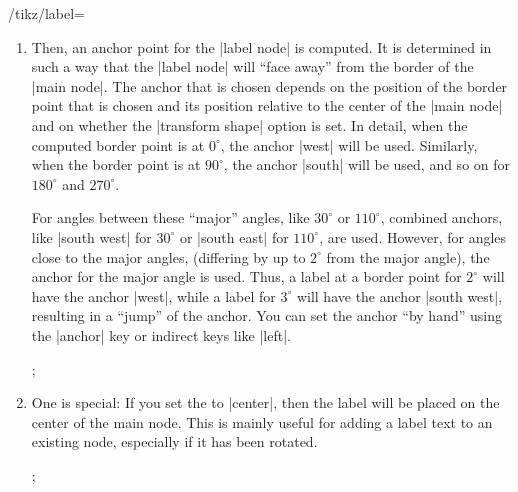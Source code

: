 \begin{key}{/tikz/label=}
\begin{enumerate}
\begin{key}{/tikz/absolute= (default true)}
      The difference can be seen in the following example:
\begin{codeexample}[]
\tikz [rotate=-80,every label/.style={draw,red}]
  ;
\end{codeexample}
\begin{codeexample}[]
\tikz [rotate=-80,every label/.style={draw,red},absolute]
  ;
\end{codeexample}
    \end{key}
  \item Then, an anchor point for the |label node| is computed. It is determined
    in such a way that the |label node| will ``face away'' from the
    border of the |main node|. The anchor that is chosen depends on
    the position of the border point that is chosen and its position
    relative to the center of the |main node| and on whether the
    |transform shape| option is set. In detail, when the computed
    border point is at $0^\circ$, the anchor |west| will be
    used. Similarly, when the border point is at $90^\circ$, the
    anchor |south| will be used, and so on for $180^\circ$ and
    $270^\circ$.

    For angles between these ``major'' angles, like
    $30^\circ$ or $110^\circ$, combined anchors, like |south west| for
    $30^\circ$ or |south east| for $110^\circ$, are used. However, for
    angles close to the major angles, (differing by up to $2^\circ$ 
    from the major angle), the anchor for the major angle is
    used. Thus, a label at a border point for $2^\circ$ will have the
    anchor |west|, while a label for $3^\circ$ will have the anchor
    |south west|, resulting in a ``jump'' of the anchor. You can set
    the anchor ``by hand'' using the |anchor| key or indirect keys
    like |left|.
\begin{codeexample}[]
\tikz 
  ;
\end{codeexample}
  \item
    One  is special: If you set the  to
    |center|, then the label will be placed on the center of the main
    node. This is mainly useful for adding a label text to an existing
    node, especially if it has been rotated.
\begin{codeexample}[]
\tikz {};
\end{codeexample}
  \end{enumerate}


\end{key}
